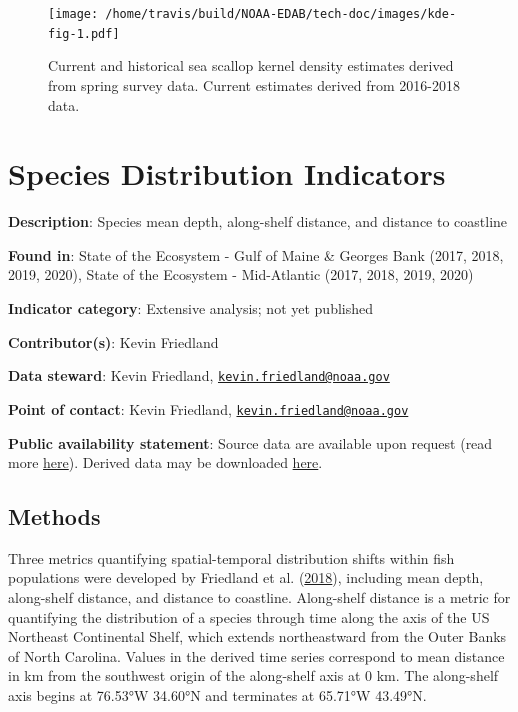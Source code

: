 \documentclass[
]{book}
\begin{document}
\begin{figure}
\centering
\texttt{[image: /home/travis/build/NOAA-EDAB/tech-doc/images/kde-fig-1.pdf]}
\caption{\label{fig:kde-fig}Current and historical sea scallop kernel density estimates derived from spring survey data. Current estimates derived from 2016-2018 data.}
\end{figure}

\hypertarget{species-distribution-indicators}{%
\chapter{Species Distribution Indicators}\label{species-distribution-indicators}}

\textbf{Description}: Species mean depth, along-shelf distance, and distance to coastline

\textbf{Found in}: State of the Ecosystem - Gulf of Maine \& Georges Bank (2017, 2018, 2019, 2020), State of the Ecosystem - Mid-Atlantic (2017, 2018, 2019, 2020)

\textbf{Indicator category}: Extensive analysis; not yet published

\textbf{Contributor(s)}: Kevin Friedland

\textbf{Data steward}: Kevin Friedland, \href{mailto:kevin.friedland@noaa.gov}{\nolinkurl{kevin.friedland@noaa.gov}}

\textbf{Point of contact}: Kevin Friedland, \href{mailto:kevin.friedland@noaa.gov}{\nolinkurl{kevin.friedland@noaa.gov}}

\textbf{Public availability statement}: Source data are available upon request (read more \href{https://inport.nmfs.noaa.gov/inport/item/22560}{here}). Derived data may be downloaded \href{https://comet.nefsc.noaa.gov/erddap/tabledap/SOE_habitat_soe_v1.html}{here}.

\hypertarget{methods-39}{%
\section{Methods}\label{methods-39}}

Three metrics quantifying spatial-temporal distribution shifts within fish populations were developed by Friedland et al. (\protect\hyperlink{ref-Friedland2018}{2018}), including mean depth, along-shelf distance, and distance to coastline. Along-shelf distance is a metric for quantifying the distribution of a species through time along the axis of the US Northeast Continental Shelf, which extends northeastward from the Outer Banks of North Carolina. Values in the derived time series correspond to mean distance in km from the southwest origin of the along-shelf axis at 0 km. The along-shelf axis begins at 76.53°W 34.60°N and terminates at 65.71°W 43.49°N.
\end{document}
